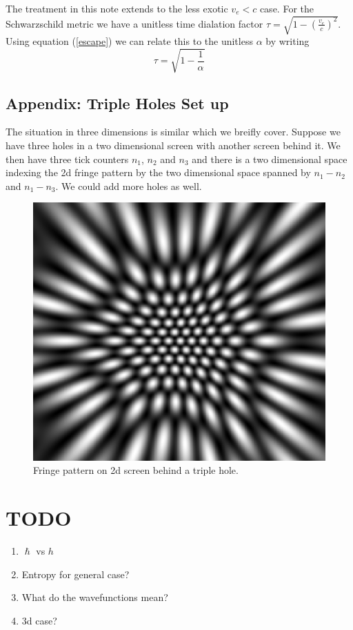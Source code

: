 \documentclass[12pt,a4paper]{article}
\begin{document}
The treatment in this note extends to the less exotic $v_e < c$ case.  For the Schwarzschild metric we have a unitless time dialation factor $\tau = \sqrt{1 - \left(\frac{v_e}{c}\right)^2}$.  Using equation (\ref{escape}) we can relate this to the unitless $\alpha$ by writing
\[
\tau = \sqrt{1 - \frac{1}{\alpha}}
\]


\subsection{Appendix: Triple Holes Set up}

The situation in three dimensions is similar which we breifly cover.  Suppose we have three holes in a two dimensional screen with another screen behind it.  We then have three tick counters $n_1$, $n_2$ and $n_3$ and there is a two dimensional space indexing the 2d fringe pattern by the two dimensional space spanned by $n_1 - n_2$ and $n_1 - n_3$.  We could add more holes as well.

\begin{figure}[h!]
\centering
\includegraphics[scale=0.5]{triple_hole.png}
\caption{Fringe pattern on 2d screen behind a triple hole.}
\label{screen}
\end{figure}


\section{TODO}
\begin{enumerate}
\item $\hslash$ vs $h$
\item Entropy for general case?
\item What do the wavefunctions mean?
\item 3d case?
\end{enumerate}
\end{document}
